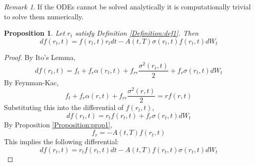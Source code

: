 \documentclass[12pt]{article}
\newtheorem{bond}{Proposition}
\theoremstyle{definition}
\theoremstyle{remark}
\newtheorem{rem}{Remark}
\begin{document}
\begin{rem}
If the ODEs cannot be solved analytically it is computationally trivial to solve them numerically.
\end{rem}
\begin{bond}
Let \(r_t\) satisfy Definition \ref{Definition:def1}.  Then
\[df(r_t, t)=f(r_t, t)r_t dt-A(t, T) \sigma(r_t, t) f(r_t, t) dW_t \]
\label{Proposition:prop2}
\end{bond}
\begin{proof}
By Ito's Lemma, 
\[df(r_t, t)=f_t+f_{r} \alpha(r_t, t)+f_{rr} \frac{\sigma^2 (r_t, t)}{2} +f_r \sigma(r_t, t) dW_t \]
By Feynman-Kac, \[f_t+f_{r} \alpha(r, t)+f_{rr} \frac{\sigma^2 (r, t)}{2}=rf(r, t)\]
Substituting this into the differential of \(f(r_t, t)\), 
\[df(r_t, t)=r_tf(r_t, t) +f_r \sigma(r_t, t) dW_t\]
By Proposition \ref{Proposition:prop1}, 
\[f_r=-A(t, T) f(r_t, t) \]
This implies the following differential:
\[df(r_t, t)=r_tf(r_t, t)dt  -A(t, T) f(r_t, t)\sigma(r_t, t) dW_t\]
\end{proof}
\end{document}
